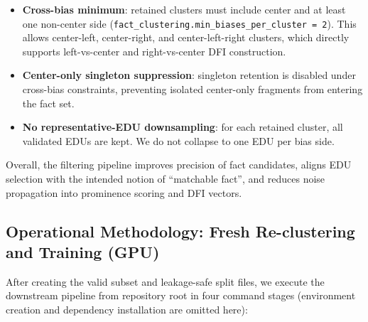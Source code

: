 \documentclass[12pt,a4paper]{article}
\begin{document}
\begin{itemize}
\item \textbf{Cross-bias minimum}:
	retained clusters must include center and at least one non-center side
	(\texttt{fact\_clustering.min\_biases\_per\_cluster = 2}).
	This allows center-left, center-right, and center-left-right clusters,
	which directly supports left-vs-center and right-vs-center DFI construction.

\item \textbf{Center-only singleton suppression}:
	singleton retention is disabled under cross-bias constraints,
	preventing isolated center-only fragments from entering the fact set.

\item \textbf{No representative-EDU downsampling}:
	for each retained cluster, all validated EDUs are kept.
	We do not collapse to one EDU per bias side.
\end{itemize}

Overall, the filtering pipeline improves precision of fact candidates,
aligns EDU selection with the intended notion of ``matchable fact'',
and reduces noise propagation into prominence scoring and DFI vectors.

\subsection{Operational Methodology: Fresh Re-clustering and Training (GPU)}

After creating the valid subset and leakage-safe split files, we execute the downstream pipeline
from repository root in four command stages (environment creation and dependency installation are omitted here):
\end{document}
